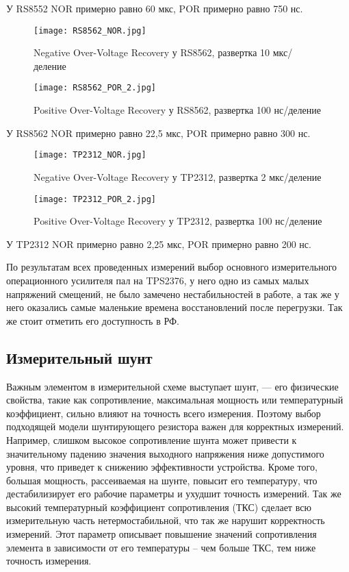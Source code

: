 У RS8552 NOR примерно равно 60 мкс, 
POR примерно равно 750 нс.

\begin{figure}[H]
\centering
\texttt{[image: RS8562\_NOR.jpg]}
\caption{Negative Over-Voltage Recovery у RS8562, развертка 10 мкс/деление}
\label{ris:423}
\end{figure}

\begin{figure}[H]
\centering
\texttt{[image: RS8562\_POR\_2.jpg]}
\caption{Positive Over-Voltage Recovery у RS8562, развертка 100 нс/деление}
\label{ris:424}
\end{figure}

У RS8562 NOR примерно равно 22,5 мкс, 
POR примерно равно 300 нс.

\begin{figure}[H]
\centering
\texttt{[image: TP2312\_NOR.jpg]}
\caption{Negative Over-Voltage Recovery у TP2312, развертка 2 мкс/деление}
\label{ris:425}
\end{figure}

\begin{figure}[H]
\centering
\texttt{[image: TP2312\_POR\_2.jpg]}
\caption{Positive Over-Voltage Recovery у TP2312, развертка 100 нс/деление}
\label{ris:426}
\end{figure}

У TP2312 NOR примерно равно 2,25 мкс,
POR примерно равно 200 нс.

По результатам всех проведенных измерений выбор основного измерительного операционного усилителя пал на 
TPS2376, у него одно из самых малых напряжений смещений, не было замечено нестабильностей в работе, 
а так же у него оказались самые маленькие времена восстановлений после перегрузки. Так же стоит отметить 
его доступность в РФ.

\subsection{Измерительный шунт}
\hspace{1cm} 

Важным элементом в измерительной схеме выступает шунт, — его физические свойства, 
такие как сопротивление, максимальная мощность или температурный коэффициент, 
сильно влияют на точность всего измерения. Поэтому выбор подходящей модели шунтирующего резистора 
важен для корректных измерений. Например, слишком высокое сопротивление шунта может привести к 
значительному падению значения выходного напряжения ниже допустимого уровня, что приведет к снижению 
эффективности устройства. Кроме того, большая мощность, рассеиваемая на шунте, повысит его температуру, 
что дестабилизирует его рабочие параметры и ухудшит точность измерений. Так же высокий температурный 
коэффициент сопротивления (ТКС) сделает всю измерительную часть нетермостабильной, что так же нарушит 
корректность измерений. Этот параметр описывает повышение значений сопротивления элемента в зависимости от
его температуры -- чем больше ТКС, тем ниже точность измерения.

